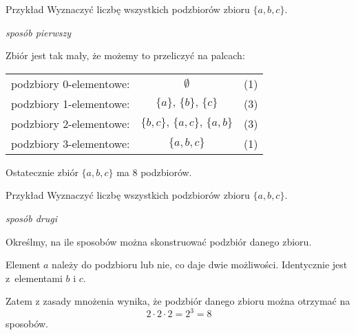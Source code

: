 \documentclass[a4paper,10pt]{beamer}
\begin{document}
\begin{frame}

	\begin{exampleblock}{Przykład}
		Wyznaczyć liczbę wszystkich podzbiorów zbioru $\{a,b,c\}$.
		\vspace{0.3cm}
		\begin{center}{\it sposób pierwszy}\end{center}
		Zbiór jest tak mały, że możemy to przeliczyć na palcach:
		
		\begin{center}
			\begin{tabular}{ccc}
			podzbiory 0-elementowe:&$\emptyset$&(1)\\
			podzbiory 1-elementowe:&$\{a\},\,\{b\},\,\{c\}$&(3)\\
			podzbiory 2-elementowe:&$\{b,c\},\,\{a,c\},\,\{a,b\}$&(3)\\
			podzbiory 3-elementowe:&$\{a,b,c\}$&(1)
			\end{tabular}
		\end{center}
		
		Ostatecznie zbiór $\{a,b,c\}$ ma 8 podzbiorów.
	\end{exampleblock}

\end{frame}



\begin{frame}
	
	\begin{exampleblock}{Przykład}
		Wyznaczyć liczbę wszystkich podzbiorów zbioru $\{a,b,c\}$.
		\vspace{0.3cm}
		\begin{center}{\it sposób drugi}\end{center}
		Określmy, na ile sposobów można skonstruować podzbiór danego zbioru.

		Element $a$ należy do podzbioru lub nie, co daje dwie możliwości. Identycznie jest z~elementami $b$ i $c$.
		
		Zatem z zasady mnożenia wynika, że podzbiór danego zbioru można otrzymać na $$2\cdot2\cdot2=2^3=8$$ sposobów.
	\end{exampleblock}
	
\end{frame}
\end{document}
